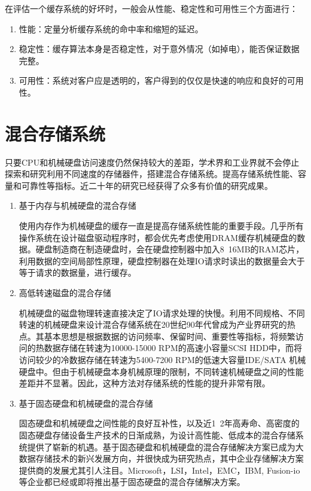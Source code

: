 在评估一个缓存系统的好坏时，一般会从性能、稳定性和可用性三个方面进行：
\begin{enumerate}
\item 性能：定量分析缓存系统的命中率和缩短的延迟。
\item 稳定性：缓存算法本身是否稳定性，对于意外情况（如掉电），能否保证数据完整。
\item 可用性：系统对客户应是透明的，客户得到的仅仅是快速的响应和良好的可用性。
\end{enumerate}

\section{混合存储系统}
\label{sec:hybrid_storage}

只要CPU和机械硬盘访问速度仍然保持较大的差距，学术界和工业界就不会停止探索和研究利用不同速度的存储器件，搭建混合存储系统。提高存储系统性能、容量和可靠性等指标。近二十年的研究已经获得了众多有价值的研究成果。

\begin{enumerate}

\item 基于内存与机械硬盘的混合存储

使用内存作为机械硬盘的缓存一直是提高存储系统性能的重要手段。几乎所有操作系统在设计磁盘驱动程序时，都会优先考虑使用DRAM缓存机械硬盘的数据。硬盘制造商在制造硬盘时，会在硬盘控制器中加入8~16MB的RAM芯片，利用数据的空间局部性原理，硬盘控制器在处理IO请求时读出的数据量会大于等于请求的数据量，进行缓存。

\item 高低转速磁盘的混合存储

机械硬盘的磁盘物理转速直接决定了IO请求处理的快慢。利用不同规格、不同转速的机械硬盘来设计混合存储系统在20世纪90年代曾成为产业界研究的热点。其基本思想是根据数据的访问频率、保留时间、重要性等指标，将频繁访问的热数据存储在转速为10000-15000 RPM的高速小容量SCSI HDD中，而将访问较少的冷数据存储在转速为5400-7200 RPM的低速大容量IDE/SATA 机械硬盘中。但由于机械硬盘本身机械原理的限制，不同转速机械硬盘之间的性能差距并不显著。因此，这种方法对存储系统的性能的提升非常有限。

\item 基于固态硬盘和机械硬盘的混合存储

固态硬盘和机械硬盘之间性能的良好互补性，以及近1~2年高寿命、高密度的固态硬盘存储设备生产技术的日渐成熟，为设计高性能、低成本的混合存储系统提供了崭新的机遇。基于固态硬盘和机械硬盘的混合存储解决方案已成为大数据存储技术的新兴发展方向，并很快成为研究热点，其中企业存储解决方案提供商的发展尤其引人注目。Microsoft，LSI，Intel，EMC，IBM, Fusion-io等企业都已经或即将推出基于固态硬盘的混合存储解决方案。

\end{enumerate}

